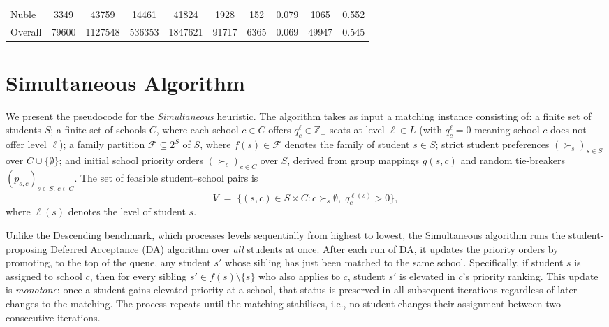 \documentclass[12pt]{article}
\begin{document}
\begin{table}[htp!]
\begin{tabular}[t]{lccccccccc}
        Nuble                 & 3349                         & 43759                        & 14461                     & 41824                          & 1928                      & 152  & 0.079 & 1065  & 0.552 \\
        Overall               & 79600                        & 1127548                      & 536353                    & 1847621                        & 91717                     & 6365 & 0.069 & 49947 & 0.545 \\
        \bottomrule
    \end{tabular}
\end{table}

\clearpage
\section{Simultaneous Algorithm}

We present the pseudocode for the \emph{Simultaneous} heuristic. The algorithm
takes as input a matching instance consisting of: a finite set of students
$S$; a finite set of schools $C$, where each school $c\in C$ offers
$q_c^\ell \in \mathbb{Z}_+$ seats at level $\ell\in L$ (with $q_c^\ell = 0$
meaning school $c$ does not offer level $\ell$); a family partition
$\mathcal{F}\subseteq 2^S$ of $S$, where $f(s)\in\mathcal{F}$ denotes the
family of student $s\in S$; strict student preferences
$(\succ_s)_{s\in S}$ over $C\cup\{\emptyset\}$; and initial school
priority orders $(\succ_c)_{c\in C}$ over $S$, derived from group
mappings $g(s,c)$ and random tie-breakers $(p_{s,c})_{s\in S,\,c\in C}$. The
set of feasible student--school pairs is
\[
    V \;=\; \{(s,c)\in S\times C : c\succ_s\emptyset,\; q_c^{\ell(s)}>0\},
\]
where $\ell(s)$ denotes the level of student $s$.

Unlike the Descending benchmark, which processes levels sequentially from
highest to lowest, the Simultaneous algorithm runs the student-proposing
Deferred Acceptance (DA) algorithm over \emph{all} students at once. After
each run of DA, it updates the priority orders by promoting, to the top of the
queue, any student $s'$ whose sibling has just been matched to the same school.
Specifically, if student $s$ is assigned to school $c$, then for every sibling
$s'\in f(s)\setminus\{s\}$ who also applies to $c$, student $s'$ is elevated in
$c$'s priority ranking. This update is \emph{monotone}: once a student gains
elevated priority at a school, that status is preserved in all subsequent
iterations regardless of later changes to the matching. The process repeats
until the matching stabilises, i.e., no student changes their assignment between
two consecutive iterations.
\end{document}
